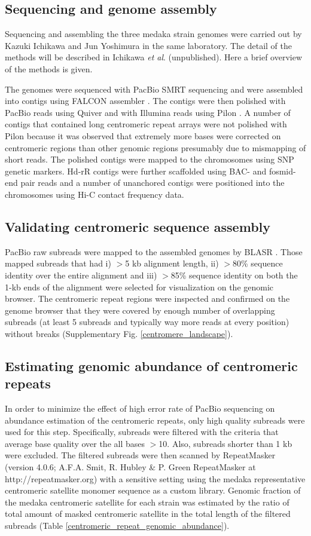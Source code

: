 \subsection*{Sequencing and genome assembly}
  Sequencing and assembling the three medaka strain genomes were carried out by Kazuki Ichikawa and Jun Yoshimura in the same laboratory. The detail of the methods will be described in Ichikawa \textit{et al}. (unpublished). Here a brief overview of the methods is given.

  The genomes were sequenced with PacBio SMRT sequencing and were assembled into contigs using FALCON assembler \cite{}. The contigs were then polished with PacBio reads using Quiver \cite{} and with Illumina reads using Pilon \cite{}. A number of contigs that contained long centromeric repeat arrays were not polished with Pilon because it was observed that extremely more bases were corrected on centromeric regions than other genomic regions presumably due to mismapping of short reads. The polished contigs were mapped to the chromosomes using SNP genetic markers. Hd-rR contigs were further scaffolded using BAC- and fosmid-end pair reads and a number of unanchored contigs were positioned into the chromosomes using Hi-C contact frequency data.


\subsection*{Validating centromeric sequence assembly}
  PacBio raw subreads were mapped to the assembled genomes by BLASR \cite{}. Those mapped subreads that had i) $>$5 kb alignment length, ii) $>$80\% sequence identity over the entire alignment and iii) $>$85\% sequence identity on both the 1-kb ends of the alignment were selected for visualization on the genomic browser. The centromeric repeat regions were inspected and confirmed on the genome browser that they were covered by enough number of overlapping subreads (at least 5 subreads and typically way more reads at every position) without breaks (Supplementary Fig. \ref{centromere_landscape}).


\subsection*{Estimating genomic abundance of centromeric repeats}
  In order to minimize the effect of high error rate of PacBio sequencing on abundance estimation of the centromeric repeats, only high quality subreads were used for this step. Specifically, subreads were filtered with the criteria that average base quality over the all bases $>$10. Also, subreads shorter than 1 kb were excluded. The filtered subreads were then scanned by RepeatMasker (version 4.0.6; A.F.A. Smit, R. Hubley & P. Green RepeatMasker at http://repeatmasker.org) with a sensitive setting using the medaka representative centromeric satellite monomer sequence as a custom library. Genomic fraction of the medaka centromeric satellite for each strain was estimated by the ratio of total amount of masked centromeric satellite in the total length of the filtered subreads (Table \ref{centromeric_repeat_genomic_abundance}).


